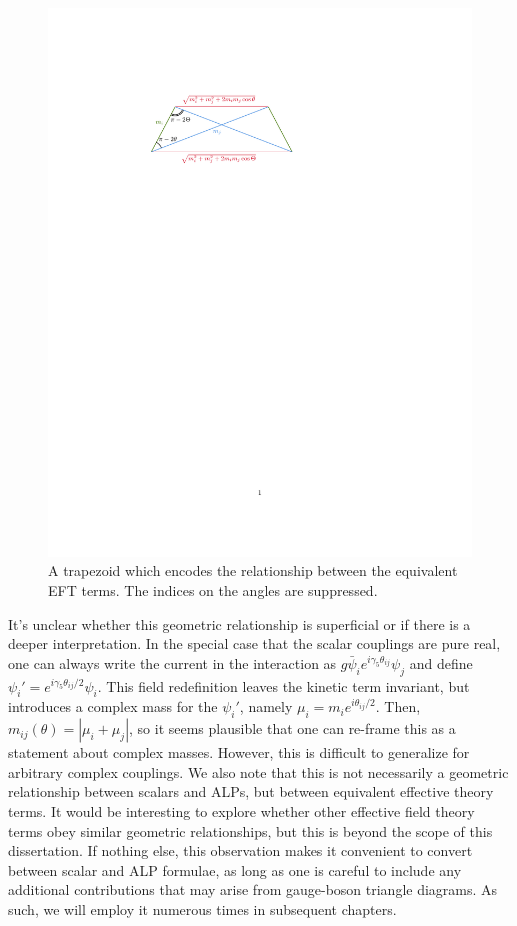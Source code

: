 {\begin{figure}
    \centering
    \includegraphics[width=0.5\linewidth]{figures/chapter2/trapezoid.pdf}
    \caption[A trapezoid which encodes the relationship between equivalent effective field theory terms.]{A trapezoid which encodes the relationship between the equivalent EFT terms. The indices on the angles are suppressed.} 
    \label{fig:trapezoid}
\end{figure}

It's unclear whether this geometric relationship is superficial or if there is a deeper interpretation. In the special case that the scalar couplings are pure real, one can always write the current in the interaction as $g \bar{\psi}_ie^{i\gamma_5 \theta_{ij}}\psi_j$ and define $\psi_{i}' = e^{i\gamma_5 \theta_{ij}/2}\psi_i$. This field redefinition leaves the kinetic term invariant, but introduces a complex mass for the $\psi_i'$, namely $\mu_i = m_i e^{i\theta_{ij}/2}$. Then, $m_{ij}(\theta) = |\mu_i + \mu_j|$, so it seems plausible that one can re-frame this as a statement about complex masses. However, this is difficult to generalize for arbitrary complex couplings. We also note that this is not necessarily a geometric relationship between scalars and ALPs, but between equivalent effective theory terms. It would be interesting to explore whether other effective field theory terms obey similar geometric relationships, but this is beyond the scope of this dissertation. If nothing else, this observation makes it convenient to convert between scalar and ALP formulae, as long as one is careful to include any additional contributions that may arise from gauge-boson triangle diagrams. As such, we will employ it numerous times in subsequent chapters.

}
